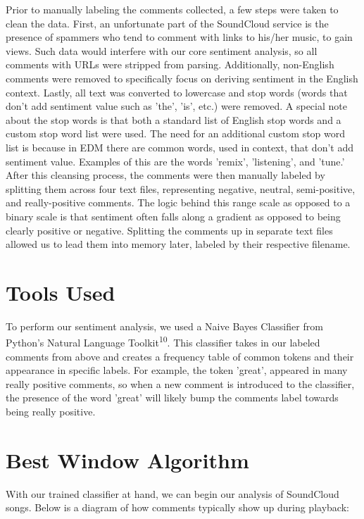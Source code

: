 \documentclass[12pt]{dalcsthesis}
\begin{document}
Prior to manually labeling the comments collected, a few steps were taken to clean the data. First, an unfortunate part of the SoundCloud service is the presence of spammers who tend to comment with links to his/her music, to gain views. Such data would interfere with our core sentiment analysis, so all comments with URLs were stripped from parsing. Additionally, non-English comments were removed to specifically focus on deriving sentiment in the English context. Lastly, all text was converted to lowercase and stop words (words that don't add sentiment value such as 'the', 'is', etc.) were removed. A special note about the stop words is that both a standard list of English stop words and a custom stop word list were used. The need for an additional custom stop word list is because in EDM there are common words, used in context, that don't add sentiment value. Examples of this are the words 'remix', 'listening', and 'tune.' \\

After this cleansing process, the comments were then manually labeled by splitting them across four text files, representing negative, neutral, semi-positive, and really-positive comments. The logic behind this range scale as opposed to a binary scale is that sentiment often falls along a gradient as opposed to being clearly positive or negative. Splitting the comments up in separate text files allowed us to lead them into memory later, labeled by their respective filename.

\section{Tools Used}

To perform our sentiment analysis, we used a Naive Bayes Classifier from Python's Natural Language Toolkit\textsuperscript{10}. This classifier takes in our labeled comments from above and creates a frequency table of common tokens and their appearance in specific labels. For example, the token 'great', appeared in many really positive comments, so when a new comment is introduced to the classifier, the presence of the word 'great' will likely bump the comments label towards being really positive.

\section{Best Window Algorithm}

With our trained classifier at hand, we can begin our analysis of SoundCloud songs. Below is a diagram of how comments typically show up during playback:  
\end{document}
